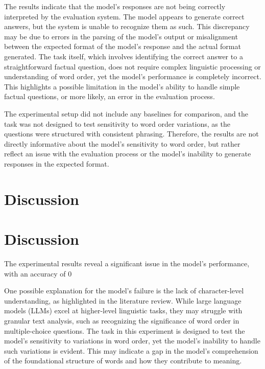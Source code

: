 \documentclass{article}
\begin{document}
The results indicate that the model's responses are not being correctly interpreted by the evaluation system. The model appears to generate correct answers, but the system is unable to recognize them as such. This discrepancy may be due to errors in the parsing of the model's output or misalignment between the expected format of the model's response and the actual format generated. The task itself, which involves identifying the correct answer to a straightforward factual question, does not require complex linguistic processing or understanding of word order, yet the model's performance is completely incorrect. This highlights a possible limitation in the model's ability to handle simple factual questions, or more likely, an error in the evaluation process.

The experimental setup did not include any baselines for comparison, and the task was not designed to test sensitivity to word order variations, as the questions were structured with consistent phrasing. Therefore, the results are not directly informative about the model's sensitivity to word order, but rather reflect an issue with the evaluation process or the model's inability to generate responses in the expected format.
\section{Discussion}
\section{Discussion}

The experimental results reveal a significant issue in the model's performance, with an accuracy of 0%

One possible explanation for the model's failure is the lack of character-level understanding, as highlighted in the literature review. While large language models (LLMs) excel at higher-level linguistic tasks, they may struggle with granular text analysis, such as recognizing the significance of word order in multiple-choice questions. The task in this experiment is designed to test the model's sensitivity to variations in word order, yet the model's inability to handle such variations is evident. This may indicate a gap in the model's comprehension of the foundational structure of words and how they contribute to meaning.
\end{document}
